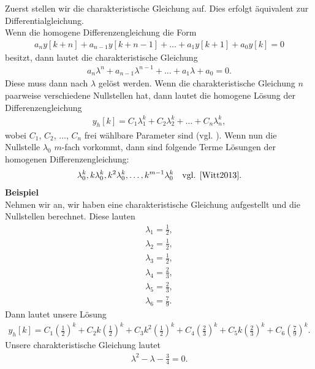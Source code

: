 \documentclass[11pt,a4paper,DIV=12]{scrartcl}
\begin{document}
%
Zuerst stellen wir die charakteristische Gleichung auf.
%
Dies erfolgt äquivalent zur Differentialgleichung.\\
%
Wenn die homogene Differenzengleichung die Form
%
\begin{gather}
	a_ny[k+n]+a_{n-1}y[k+n-1]+\dots+a_1y[k+1]+a_0y[k]=0
\end{gather}
%
besitzt, dann lautet die charakteristische Gleichung
%
\begin{gather}
	a_n\lambda^n+a_{n-1}\lambda^{n-1}+\dots+a_1\lambda+a_0=0.
\end{gather}
%
Diese muss dann nach $\lambda$ gelöst werden.
%
Wenn die charakteristische Gleichung $n$ paarweise verschiedene Nullstellen hat,
dann lautet die homogene Lösung der Differenzengleichung
%
\begin{gather}
	y_h[k]=C_1\lambda_1^k+C_2\lambda_2^k+\dots+C_n\lambda_n^k,
\end{gather}
%
wobei $C_1$, $C_2$, $\dots$, $C_n$ frei wählbare Parameter sind
(vgl. \cite[Kap. 5, S. 85]{Witt2013}).
%
Wenn nun die Nullstelle $\lambda_0$ $m$-fach vorkommt,
dann sind folgende Terme Lösungen der homogenen Differenzengleichung:
%
\begin{gather}
	\lambda_0^k,k\lambda_0^k,k^2\lambda_0^k,\dots,k^{m-1}\lambda_0^k\quad\text{vgl. \cite[Kap. 5, S. 91]{Witt2013}}.
\end{gather}
%
\textbf{Beispiel}\\
%
Nehmen wir an, wir haben eine charakteristische Gleichung aufgestellt und
die Nullstellen berechnet.
%
Diese lauten
%
\begin{gather}
	\lambda_1 = \frac{1}{2},\nonumber\\
	\lambda_2 = \frac{1}{2},\nonumber\\
	\lambda_3 = \frac{1}{2},\nonumber\\
	\lambda_4 = \frac{2}{3},\nonumber\\
	\lambda_5 = \frac{2}{3},\nonumber\\
	\lambda_6 = \frac{7}{9}.\nonumber
\end{gather}
%
Dann lautet unsere Lösung
%
\begin{gather}
	y_h[k]=C_1\left(\frac{1}{2}\right)^k+C_2k\left(\frac{1}{2}\right)^k+C_3k^2\left(\frac{1}{2}\right)^k+C_4\left(\frac{2}{3}\right)^k+C_5k\left(\frac{2}{3}\right)^k+C_6\left(\frac{7}{9}\right)^k.
\end{gather}
%
Unsere charakteristische Gleichung lautet
%
\begin{gather}
	\lambda^2-\lambda-\frac{3}{4}=0.
\end{gather}
\end{document}
